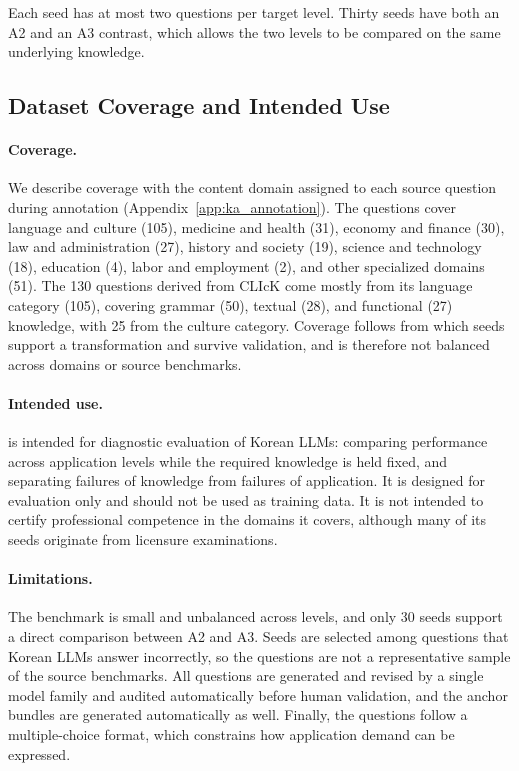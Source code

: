 

Each seed has at most two questions per target level.
Thirty seeds have both an A2 and an A3 contrast, which allows the two levels to be compared on the same underlying knowledge.

\subsection{Dataset Coverage and Intended Use}

\paragraph{Coverage.}
We describe coverage with the content domain assigned to each source question during annotation (Appendix~\ref{app:ka_annotation}).
The questions cover language and culture (105), medicine and health (31), economy and finance (30), law and administration (27), history and society (19), science and technology (18), education (4), labor and employment (2), and other specialized domains (51).
The 130 questions derived from CLIcK come mostly from its language category (105), covering grammar (50), textual (28), and functional (27) knowledge, with 25 from the culture category.
Coverage follows from which seeds support a transformation and survive validation, and is therefore not balanced across domains or source benchmarks.

\paragraph{Intended use.}
\name{} is intended for diagnostic evaluation of Korean LLMs: comparing performance across application levels while the required knowledge is held fixed, and separating failures of knowledge from failures of application.
It is designed for evaluation only and should not be used as training data.
It is not intended to certify professional competence in the domains it covers, although many of its seeds originate from licensure examinations.

\paragraph{Limitations.}
The benchmark is small and unbalanced across levels, and only 30 seeds support a direct comparison between A2 and A3.
Seeds are selected among questions that Korean LLMs answer incorrectly, so the questions are not a representative sample of the source benchmarks.
All questions are generated and revised by a single model family and audited automatically before human validation, and the anchor bundles are generated automatically as well.
Finally, the questions follow a multiple-choice format, which constrains how application demand can be expressed.

